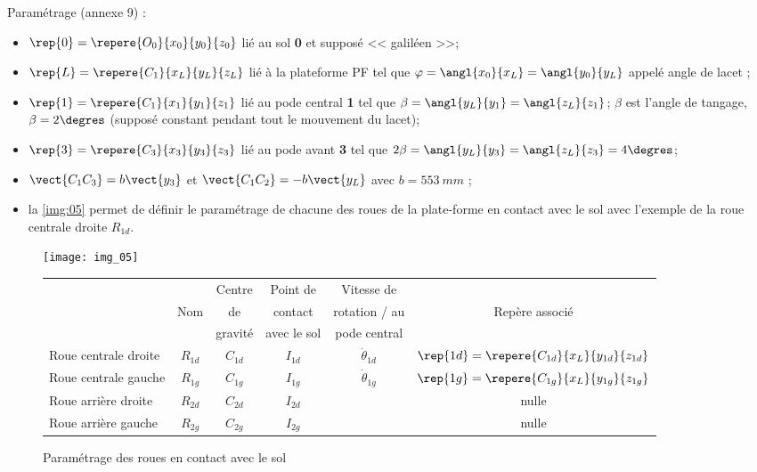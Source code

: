 Paramétrage (annexe 9) : 
\begin{itemize}
\item $\rep{0}=\repere{O_0}{x_0}{y_0}{z_0}$ lié au sol \textbf{0} et supposé << galiléen >>;
\item $\rep{L}=\repere{C_1}{x_L}{y_L}{z_L}$ lié à la plateforme PF tel que $\varphi=\angl{x_0}{x_L}=\angl{y_0}{y_L}$ appelé angle de lacet ;
\item $\rep{1}=\repere{C_1}{x_1}{y_1}{z_1}$ lié au pode central \textbf{1} tel que $\beta=\angl{y_L}{y_1}=\angl{z_L}{z_1}$; $\beta$ est l'angle de tangage, $\beta=2\degres$ (supposé constant pendant tout le mouvement du lacet);
\item $\rep{3}=\repere{C_3}{x_3}{y_3}{z_3}$ lié au pode avant \textbf{3} tel que $2\beta=\angl{y_L}{y_3}=\angl{z_L}{z_3}=4\degres$;
\item $\vect{C_1C_3}=b\vect{y_3}$ et $\vect{C_1C_2}=-b\vect{y_L}$ avec $b = \SI{553}{mm}$ ;
\item la \autoref{img:05} permet de définir le paramétrage de chacune des roues de la plate-forme en contact avec le sol avec
l’exemple de la roue centrale droite $R_{1d}$.
\end{itemize}

\begin{figure}[H]
\centering
\texttt{[image: img\_05]}

\vspace{.5cm}

\begin{tabular}{lccccc}
\hline
&  & Centre & Point de & Vitesse de &  \\
&    Nom     &de         & contact  & rotation / au & Repère associé \\
&        & gravité & avec le sol & pode central & \\ \hline\hline
Roue centrale droite & $R_{1d}$ & $C_{1d}$ & $I_{1d}$ & $\dot{\theta}_{1d}$ & $\rep{1d}=\repere{C_{1d}}{x_L}{y_{1d}}{z_{1d}}$ \\ \hline
Roue centrale gauche & $R_{1g}$ & $C_{1g}$ & $I_{1g}$ & $\dot{\theta}_{1g}$ & $\rep{1g}=\repere{C_{1g}}{x_L}{y_{1g}}{z_{1g}}$ \\ \hline
Roue arrière droite & $R_{2d}$ & $C_{2d}$ & $I_{2d}$ & & nulle \\ \hline
Roue arrière gauche & $R_{2g}$ & $C_{2g}$ & $I_{2g}$ & & nulle \\ \hline
\end{tabular}

\caption{Paramétrage des roues en contact avec le sol \label{img:05}}
\end{figure}

